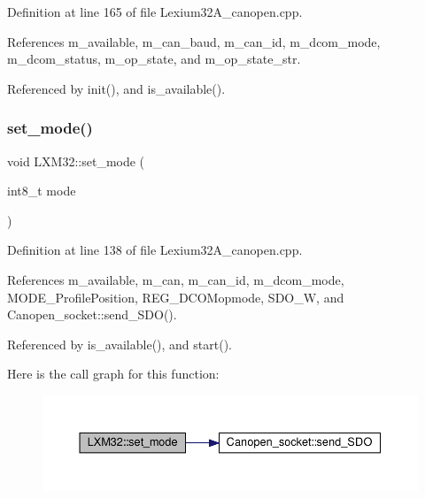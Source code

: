 Definition at line 165 of file Lexium32\+A\+\_\+canopen.\+cpp.



References m\+\_\+available, m\+\_\+can\+\_\+baud, m\+\_\+can\+\_\+id, m\+\_\+dcom\+\_\+mode, m\+\_\+dcom\+\_\+status, m\+\_\+op\+\_\+state, and m\+\_\+op\+\_\+state\+\_\+str.



Referenced by init(), and is\+\_\+available().

\mbox{\label{class_l_x_m32_a4087402e009dd3be18765caac410d412}} 
\subsubsection{\texorpdfstring{set\+\_\+mode()}{set\_mode()}}
{\footnotesize\ttfamily void L\+X\+M32\+::set\+\_\+mode (\begin{DoxyParamCaption}\item[{int8\+\_\+t}]{mode }\end{DoxyParamCaption})}



Definition at line 138 of file Lexium32\+A\+\_\+canopen.\+cpp.



References m\+\_\+available, m\+\_\+can, m\+\_\+can\+\_\+id, m\+\_\+dcom\+\_\+mode, M\+O\+D\+E\+\_\+\+Profile\+Position, R\+E\+G\+\_\+\+D\+C\+O\+Mopmode, S\+D\+O\+\_\+W, and Canopen\+\_\+socket\+::send\+\_\+\+S\+D\+O().



Referenced by is\+\_\+available(), and start().

Here is the call graph for this function\+:\nopagebreak
\begin{figure}[H]
\begin{center}
\leavevmode
\includegraphics[width=350pt]{class_l_x_m32_a4087402e009dd3be18765caac410d412_cgraph}
\end{center}
\end{figure}
\mbox{\label{class_l_x_m32_ab942cd394ba87efa06704e9921395692}} 
